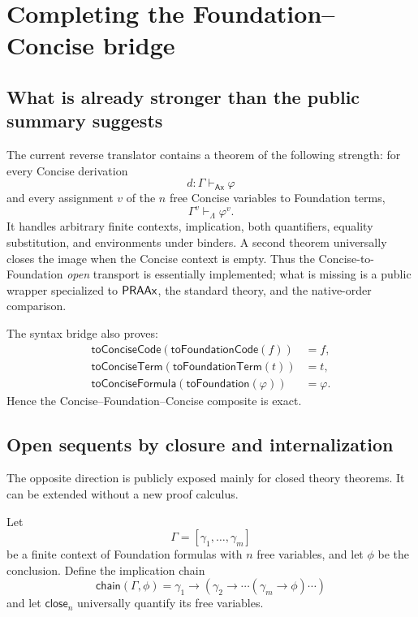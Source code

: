 
\section{Completing the Foundation--Concise bridge}
\label{sec:bridge}

\subsection{What is already stronger than the public summary suggests}

The current reverse translator contains a theorem of the following strength:
for every Concise derivation
\[
        d:\Gamma\vdash_{\mathsf{Ax}}\varphi
\]
and every assignment \(v\) of the \(n\) free Concise variables to Foundation
terms,
\[
   \Gamma^{v}\vdash_{\Lambda}\varphi^{v}.
\]
It handles arbitrary finite contexts, implication, both quantifiers, equality
substitution, and environments under binders.  A second theorem universally
closes the image when the Concise context is empty.  Thus the
Concise-to-Foundation \emph{open} transport is essentially implemented; what
is missing is a public wrapper specialized to \(\mathsf{PRAAx}\), the standard theory,
and the native-order comparison.

The syntax bridge also proves:
\[
\begin{aligned}
 \mathsf{toConciseCode}(\mathsf{toFoundationCode}(f))&=f,\\
 \mathsf{toConciseTerm}(\mathsf{toFoundationTerm}(t))&=t,\\
 \mathsf{toConciseFormula}(\mathsf{toFoundation}(\varphi))&=\varphi.
\end{aligned}
\]
Hence the Concise--Foundation--Concise composite is exact.

\subsection{Open sequents by closure and internalization}

The opposite direction is publicly exposed mainly for closed theory
theorems.  It can be extended without a new proof calculus.

Let
\[
   \Gamma=[\gamma_1,\ldots,\gamma_m]
\]
be a finite context of Foundation formulas with \(n\) free variables, and let
\(\phi\) be the conclusion.  Define the implication chain
\[
 \mathsf{chain}(\Gamma,\phi)
   =\gamma_1\to(\gamma_2\to\cdots(\gamma_m\to\phi)\cdots)
\]
and let \(\mathsf{close}_n\) universally quantify its free variables.


